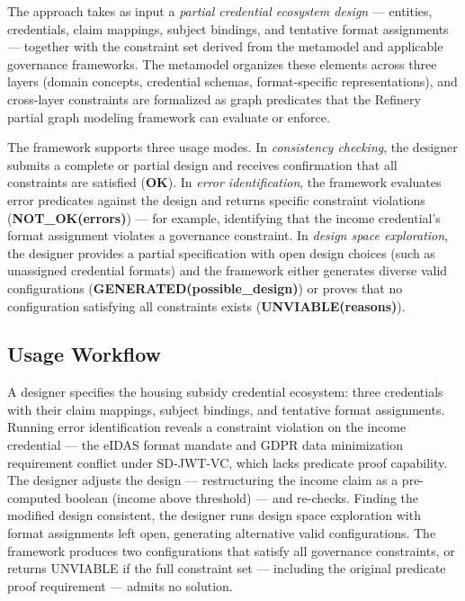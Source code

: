 \label{sec:functional-overview}


The approach takes as input a \emph{partial credential ecosystem design} --- entities, credentials, claim mappings, subject bindings, and tentative format assignments --- together with the constraint set derived from the metamodel and applicable governance frameworks. The metamodel organizes these elements across three layers (domain concepts, credential schemas, format-specific representations), and cross-layer constraints are formalized as graph predicates that the Refinery partial graph modeling framework \citep{marussy_refinery_2024} can evaluate or enforce.

The framework supports three usage modes. In \emph{consistency checking}, the designer submits a complete or partial design and receives confirmation that all constraints are satisfied (\textbf{OK}). In \emph{error identification}, the framework evaluates error predicates against the design and returns specific constraint violations (\textbf{NOT\_OK(errors)}) --- for example, identifying that the income credential's format assignment violates a governance constraint. In \emph{design space exploration}, the designer provides a partial specification with open design choices (such as unassigned credential formats) and the framework either generates diverse valid configurations (\textbf{GENERATED(possible\_design)}) or proves that no configuration satisfying all constraints exists (\textbf{UNVIABLE(reasons)}).

\subsection{Usage Workflow}\label{usage-workflow}

\label{sec:usage-workflow}

A designer specifies the housing subsidy credential ecosystem: three credentials with their claim mappings, subject bindings, and tentative format assignments. Running error identification reveals a constraint violation on the income credential --- the eIDAS format mandate and GDPR data minimization requirement conflict under SD-JWT-VC, which lacks predicate proof capability. The designer adjusts the design --- restructuring the income claim as a pre-computed boolean (income above threshold) --- and re-checks. Finding the modified design consistent, the designer runs design space exploration with format assignments left open, generating alternative valid configurations. The framework produces two configurations that satisfy all governance constraints, or returns UNVIABLE if the full constraint set --- including the original predicate proof requirement --- admits no solution.

